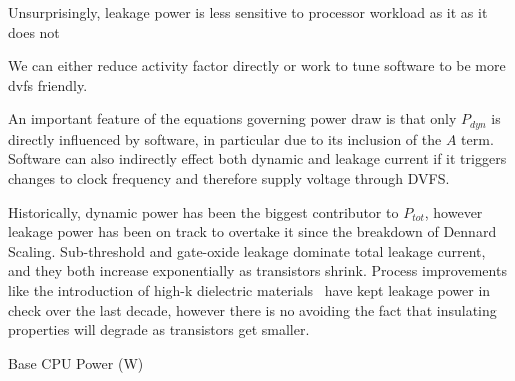 Unsurprisingly, leakage power is less sensitive to processor workload as it as it does not 


We can either reduce activity factor directly or work to tune software to be more dvfs friendly.






An important feature of the equations governing power draw is that only $P_{dyn}$ is directly influenced by software, in particular due to its inclusion of the $A$ term. Software can also indirectly effect both dynamic and leakage current if it triggers changes to clock frequency and therefore supply voltage through DVFS.  

Historically, dynamic power has been the biggest contributor to $P_{tot}$, however leakage power has been on track to overtake it since the breakdown of Dennard Scaling.  Sub-threshold and gate-oxide leakage dominate total leakage current, and they both increase exponentially as transistors shrink. Process improvements like the introduction of high-k dielectric materials~\cite{jan:2009aa} have kept leakage power in check over the last decade, however there is no avoiding the fact that insulating properties will degrade as transistors get smaller.

\begin{table}
\centering

\caption{Base CPU Power (W)}
\end{table} 

